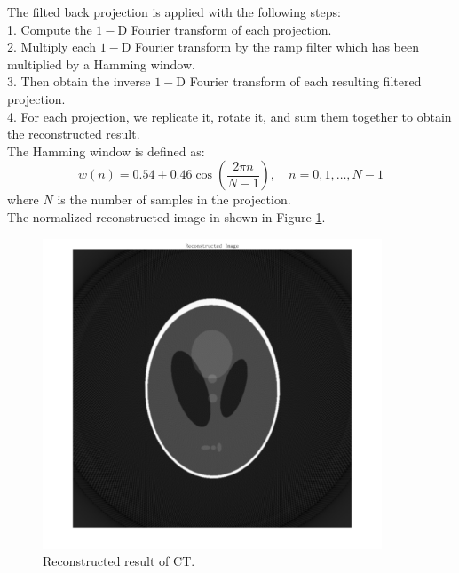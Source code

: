 The filted back projection is applied with the following steps: \\
1. Compute the $1-$D Fourier transform of each projection. \\
2. Multiply each $1-$D Fourier transform by the ramp filter which has been multiplied by a Hamming window. \\
3. Then obtain the inverse $1-$D Fourier transform of each resulting filtered projection. \\
4. For each projection, we replicate it, rotate it, and sum them together to obtain the reconstructed result. \\
The Hamming window is defined as:
$$w(n) = 0.54 + 0.46 \cos\left(\frac{2\pi n}{N-1}\right), \quad n = 0, 1, \ldots, N-1$$
where $N$ is the number of samples in the projection. \\
The normalized reconstructed image in shown in Figure \ref{fig:p1}.

\begin{figure}[htbp]
    \centering
	\includegraphics[width=0.9\textwidth]{../images/p1/p1.png}
    \caption{Reconstructed result of CT.}
    \label{fig:p1}
\end{figure}

\newpage